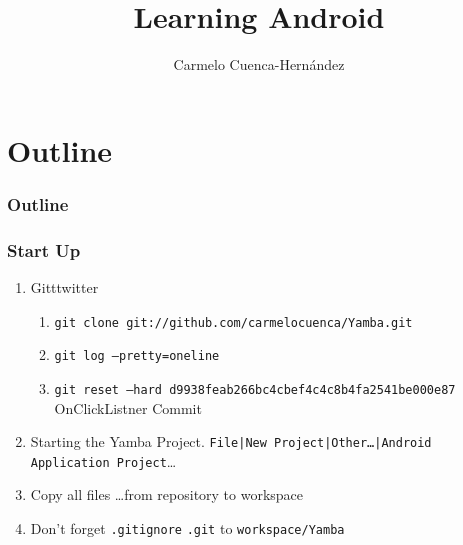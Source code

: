 \documentclass{beamer}
\title[Learning Android]{Learning Android}
\author[C. Cuenca]{Carmelo Cuenca-Hernández}
\date{}
\newcommand{\comment}[2]{#2}
\begin{document}
\begin{frame}
	\titlepage
\end{frame}


\section*{Outline}
\begin{frame}
	\frametitle{Outline}
\tableofcontents[currentsection,sectionstyle=show,hideothersubsections]
\end{frame}





%
%
%



\comment{
\section{List and Adapters}

\section{Broadcast Receeivers}

\section{Content Providers}

\section{System Services}

\section{The Android Interface Definition Language}
}

\begin{frame}
\frametitle{Start Up }
\begin{enumerate}
\item Gitttwitter
\begin{enumerate}
\item \texttt{git clone git://github.com/carmelocuenca/Yamba.git}
\item \texttt{git log --pretty=oneline}
\item \texttt{git reset --hard d9938feab266bc4cbef4c4c8b4fa2541be000e87} OnClickListner Commit
\end{enumerate}
\item Starting the Yamba Project. \texttt{File|New Project|Other\dots|Android Application Project}\dots
\item Copy all files \dots from repository to workspace
\item Don't forget \texttt{.gitignore} \texttt{.git} to \texttt{workspace/Yamba}
\end{enumerate}
\end{frame}
\end{document}
